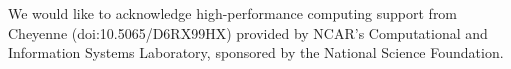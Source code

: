 

We would like to acknowledge high-performance computing support from Cheyenne (doi:10.5065/D6RX99HX) provided by NCAR's Computational and Information Systems Laboratory, sponsored by the National Science Foundation.

